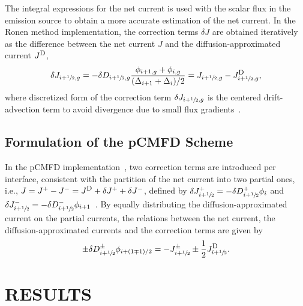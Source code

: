 \documentclass[letterpaper]{mc2021}
\newcommand{\hzi}{\ensuremath{\sfrac{1}{2}}}
\newcommand{\jD}{\ensuremath{J^{\textrm{\scriptsize{D}}}}}
\newcommand{\jp}{\ensuremath{J^+}}
\newcommand{\jm}{\ensuremath{J^-}}
\begin{document}
\vspace{-1.5mm}

The integral expressions for the net current is used with the scalar flux in the emission source to obtain a more accurate estimation of the net current. In the Ronen method implementation, the correction terms $\delta J$ are obtained  iteratively as the difference between the net current $J$ and the diffusion-approximated current $\jD$, 
\begin{equation}
\label{eq:dJ}
\delta J_{i+\hzi,g} = -\delta D_{i+\hzi,g}
\frac{\phi_{i+1,g} + \phi_{i,g}}{(\Delta_{i+1} + \Delta_i)/2} =
J_{i+\hzi,g} - \jD_{i+\hzi,g},
\end{equation}
where discretized form of the correction term $\delta J_{i+\hzi,g}$ is the centered drift-advection term to avoid divergence due to small flux gradients~\cite{Tomatis-2011,Smith-1983}.

\vspace{-1.5mm}

\subsection{Formulation of the pCMFD Scheme} 
\label{sec:pcmfd}

In the pCMFD implementation~\cite{Cho-2003}, two correction terms are introduced per interface, consistent with the partition of the net current into two partial ones, i.e., $J = \jp - \jm = \jD + \delta J^+ + \delta J^-$, defined by $\delta \jp _{i+\hzi} = -\delta D^+ _{i+\hzi} \phi_i$ and $\delta \jm _{i+\hzi} = -\delta D^- _{i+\hzi} \phi_{i+1}$~\cite{Jarrett-2016,Zhu-2016}. By equally distributing the diffusion-approximated current on the partial currents, the relations between the net current, the diffusion-approximated currents and the correction terms are given by
\begin{equation}
\label{eq:delta-D-pCMFD}
\pm \delta D^{\pm} _{i+\hzi} \phi_{i+(1\mp 1)/2} = 
- J^\pm_{i+\hzi} \pm \frac{1}{2}\jD_{i+\hzi} .
\end{equation}

\vspace{-5.5mm}


\section{RESULTS}
\end{document}
